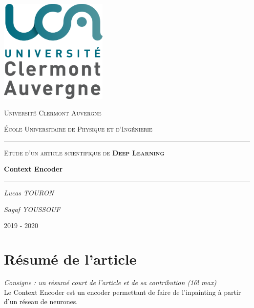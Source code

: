 \documentclass[11pt,a4paper]{article}
\begin{document}
    \begin{titlepage}
        \centering
        \includegraphics[width=0.40\textwidth]{uca.png}\par\vspace{1cm}
        {\scshape\LARGE Université Clermont Auvergne \par}
        {\scshape École Universitaire de Physique et d'Ingénierie \par}
        \vspace{2cm}
        \noindent\rule{\textwidth}{0.5pt}\par
        {\scshape\Large Etude d'un article scientifique de \textbf{Deep Learning}\par}
        \vspace{0.5cm}
        {\huge\bfseries Context Encoder\par}
        \noindent\rule{\textwidth}{0.5pt}\par
        \vspace{5cm}
        {\Large\itshape Lucas TOURON\par}
        {\Large\itshape Sagaf YOUSSOUF\par}

        \vfill

        {\large 2019 - 2020\par}
    \end{titlepage}



    \tableofcontents
    \newpage
    
    
    
    \section{Résumé de l'article}
    \emph{Consigne : un résumé court de l'article et de sa contribution (10l max)}\\
    Le Context Encoder est un encoder permettant de faire de l'inpainting à partir d'un réseau de neurones.
\end{document}
